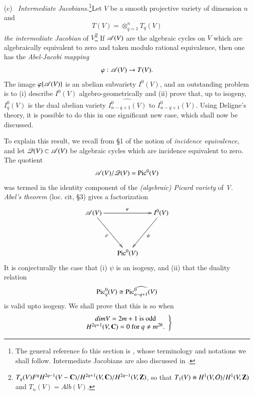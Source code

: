 \noindent
(c)~ \textit{Intermediate Jacobians.}\footnote[24]{The general reference fo this section is \cite{art4-key22}, whose terminology and notations we shall follow. Intermediate Jacobians are also discussed in \cite{art4-key36}.}\pageoriginale Let $V$ be a smooth projective variety of dimension $n$ and
$$
T (V) = \otimes^n_{q=1} T_q (V)
$$
\textit{the intermediate Jacobian} of $V$\footnote[25]{$T_q (V) F^q H^{2q-1} (V-\mathbf{C}) / H^{2q+1} (V, \mathbf{C}) / H^{2q-1} (V, \mathbf{Z})$, so that $T_1 (V) \cong H^1 (V, \mathcal{O})/ H^1 (V,\mathbf{Z})$ and $T_{n}(V) = Alb (V)$.} If $\mathscr{A} (V)$ are the algebraic cycles on $V$ which are algebraically equivalent to zero and taken modulo rational equivalence, then one has the \textit{Abel-Jacobi mapping}
$$
\varphi : \mathscr{A} (V) \to T (V).
$$
The image $\varphi \{\mathscr{A} (V)\}$ is an abelian subvariety $I^0(V)$, and an outstanding problem is to (i) describe $I^0(V)$ algebro-geometrically and (ii) prove that, up to isogeny, $I^0_q (V)$ is the dual abelian variety $\widehat{I^0_{n-q+1} (V)}$ to $I^0_{n-q+1} (V)$. Using Deligne's theory, it is possible to do this in one significant new case, which shall now be discussed.

To explain this result, we recall from \S 1 of \cite{art4-key22} the notion of \textit{incidence equivalence}, and let $\mathscr{Q} (V) \subset \mathscr{A} (V)$ be algebraic cycles which are incidence equivalent to zero. The quotient
$$
\mathscr{A} (V)/ \mathscr{Q} (V) = \operatorname{Pic}^0 (V)
$$
was termed in \cite{art4-key22} the identity component of the \textit{(algebraic) Picard variety} of \textit{V. Abel's theorem} (loc. cit, \S 3) gives a factorization
\begin{equation}
\vcenter{
\xymatrix@R=1.5cm@C=.6cm{ 
\sA(V) \ar[rr]^\varphi \ar[dr]_-{\rho} && I^{0}(V) \ar[dl]^-{\psi}\\
& \Pic^0(V) &}}\label{art4-eq6.7}
\end{equation}
It is conjecturally the case that (i) $\psi$ is an isogeny, and (ii) that the duality relation
\begin{equation}\label{art4-eq6.8}
\operatorname{Pic}^0_q (V) \cong \widehat{\operatorname{Pic}^0_{n-q+1} (V)}
\end{equation}
is valid upto isogeny. We shall prove that this is so when
\begin{equation}
\left.
\begin{array}{c}
dim V = 2 m +1 \text{ is odd}\\
H^{2q+1} (V, \bC) = 0 \text{ for } q \neq m\footnotemark[26]{} .
\end{array}
\right\}\label{art4-eq6.9}
\end{equation}\pageoriginale

